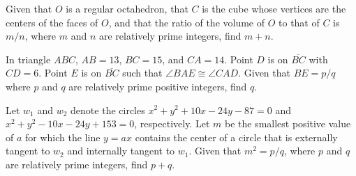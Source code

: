 \documentclass[11pt]{article}
\theoremstyle{definition}
\begin{document}
\begin{question}[name={2005 AIME II, \href{https://artofproblemsolving.com/community/c4p368278}{Problem 10}}]
	Given that $O$ is a regular octahedron, that $C$ is the cube whose vertices are the centers of the faces of $O$, and that the ratio of the volume of $O$ to that of $C$ is ${m}/{n}$, where $m$ and $n$ are relatively prime integers, find $m+n$.	
\end{question}


%	


















\begin{question}[name={2005 AIME II, \href{https://artofproblemsolving.com/community/c4p368562}{Problem 14}}]
	In triangle $ABC$, $AB=13$, $BC=15$, and $CA=14$. Point $D$ is on $\overline{BC}$ with $CD=6.$ Point $E$ is on $\overline{BC}$ such that $\angle BAE\cong \angle CAD.$ Given that $BE= p/q$ where $p$ and $q$ are relatively prime positive integers, find $q$.
\end{question}


%	













\begin{question}[name={2005 AIME II, \href{https://artofproblemsolving.com/community/c4p368567}{Problem 15}}]
	Let $w_{1}$ and $w_{2}$ denote the circles $x^{2}+y^{2}+10x-24y-87=0$ and $x^{2}+y^{2}-10x-24y+153=0$, respectively. Let $m$ be the smallest positive value of $a$ for which the line $y=ax$ contains the center of a circle that is externally tangent to $w_{2}$ and internally tangent to $w_{1}$. Given that $m^{2}=p/q$, where $p$ and $q$ are relatively prime integers, find $p+q$.
\end{question}


%	
\end{document}
